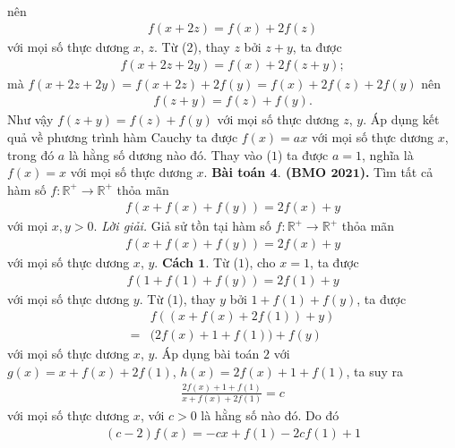 \begin{multicols}{2}
\begin{align*}
			\end{align*}
			nên 
			\begin{align*}
				f\left( {x + 2z} \right) = f(x) + 2f(z)\tag{$2$}
			\end{align*}	
			với mọi số thực dương $x$,  $z$.
			Từ ($2$), thay $z$ bởi $z+y$, ta được
			\begin{align*}
				f\left( {x + 2z + 2y} \right) = f(x) + 2f(z + y);
			\end{align*}
			mà 
			$f\left( {x + 2z + 2y} \right)=f(x + 2z) + 2f(y) =f(x) + 2f(z) + 2f(y)$ nên 
			\begin{align*}
				f(z + y) = f(z) + f(y).
			\end{align*}
			Như vậy $f(z + y) = f(z) + f(y)$ với mọi số thực dương $z$, $y$. Áp dụng kết quả về phương trình hàm Cauchy ta được
			$f(x) = ax$ với mọi số thực dương $x$,  trong đó $a$ là hằng số dương nào đó. Thay vào ($1$) ta được $a=1$, nghĩa là $f(x)= x$ với mọi số thực dương $x$.
			\vskip 0.1cm
		\textbf{\color{hoccungpi}Bài toán $\pmb{4.}$ (BMO $\pmb{2021}$).}
		Tìm tất cả hàm số $f: \mathbb{R}^{+} \rightarrow \mathbb{R}^{+}$ thỏa mãn
		\begin{align*}
			f(x+f(x)+f(y))=2 f(x)+y
		\end{align*}
		với mọi $x, y>0$.
		\vskip 0.1cm
		\textit{Lời giải.}
			Giả sử tồn tại hàm số 
			$f: \mathbb{R}^{+} \rightarrow \mathbb{R}^{+}$ thỏa mãn 
			\begin{align*}
				f(x+f(x)+f(y))=2 f(x)+y \tag{$1$}
			\end{align*}
			với mọi số thực dương $x$, $y$.
			\vskip 0.1cm
			\textbf{\color{hoccungpi}Cách $\pmb{1.}$}
			Từ ($1$), cho $x=1$, ta được
			\begin{align*}
				f(1+f(1)+f(y))=2 f(1)+y
			\end{align*}
			với mọi số thực dương  $y$. 
			Từ ($1$), thay $y$ bởi $ 1+f(1)+f(y)$, ta được
			\begin{align*}
				&f((x+f(x)+2 f(1))+y)\\
				=&\big(2 f(x)+1+f(1)\big)+f(y)
			\end{align*}
			với mọi số thực dương $x$, $y$.
			Áp dụng bài toán $2$ với $g(x)=x+f(x)+2 f(1)$, $h(x)=2 f(x)+1+f(1)$, ta suy ra
			\begin{align*}
				\frac{2 f(x)+1+f(1)}{x+f(x)+2 f(1)}=c
			\end{align*}
			với mọi số thực dương $x$, với  $ c>0$  là hằng số nào đó.
			Do đó
			\begin{align*}
				(c-2) f(x)=-c x+f(1)-2 c f(1)+1
			\end{align*}

\end{multicols}
